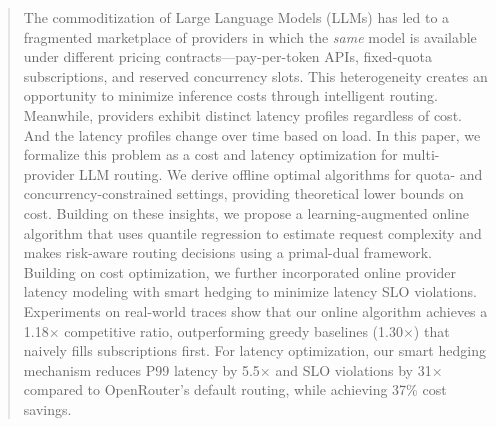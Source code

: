 \begin{abstract}
    The commoditization of Large Language Models (LLMs) has led to a fragmented
    marketplace of providers in which the \emph{same} model is available under different pricing contracts---pay-per-token APIs, fixed-quota subscriptions, and reserved concurrency slots.
    This heterogeneity creates an opportunity to minimize inference costs through intelligent routing.
    Meanwhile, providers exhibit distinct latency profiles regardless of cost. And the latency profiles change over time based on load.
    In this paper, we formalize this problem as a cost and latency optimization for multi-provider LLM routing. We derive offline optimal algorithms for quota- and concurrency-constrained settings, providing theoretical lower bounds on cost. Building on these insights, we propose a learning-augmented online algorithm that uses quantile regression to estimate request complexity and makes risk-aware routing decisions using a primal-dual framework.
    Building on cost optimization, we further incorporated online provider latency modeling with smart hedging to minimize latency SLO violations.
    Experiments on real-world traces show that our online algorithm achieves a 1.18$\times$ competitive ratio, outperforming greedy baselines (1.30$\times$) that naively fills subscriptions first. For latency optimization, our smart hedging mechanism reduces P99 latency by 5.5$\times$ and SLO violations by 31$\times$ compared to OpenRouter's default routing, while achieving 37\% cost savings.
    \end{abstract}
